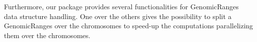 
Furthermore, our package provides several functionalities for GenomicRanges data structure
handling. One over the others gives the possibility to split a GenomicRanges over the chromosomes
to speed-up the computations parallelizing them over the chromosomes.